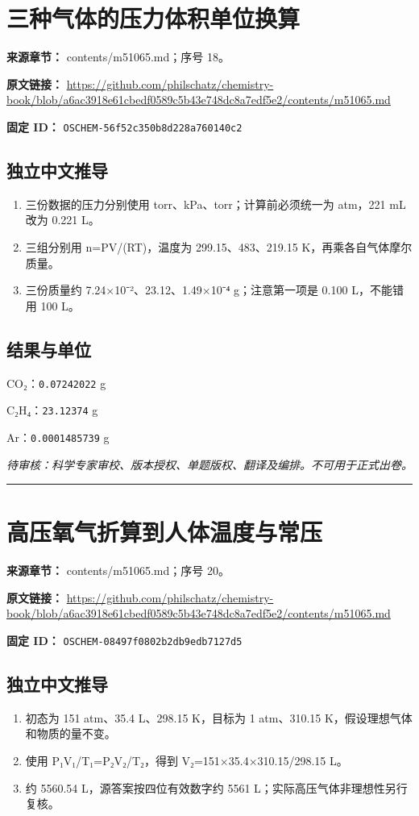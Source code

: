 \documentclass[UTF8,11pt,oneside,openany,fontset=none]{ctexbook}
\begin{document}
\section{三种气体的压力体积单位换算}
\noindent\textbf{来源章节：} contents/m51065.md；序号 18。\par
\noindent\textbf{原文链接：} \url{https://github.com/philschatz/chemistry-book/blob/a6ac3918e61cbedf0589c5b43e748dc8a7edf5e2/contents/m51065.md}\par
\noindent\textbf{固定 ID：} \texttt{OSCHEM-56f52c350b8d228a760140c2}\par
\subsection*{独立中文推导}
\begin{enumerate}
\item 三份数据的压力分别使用 torr、kPa、torr；计算前必须统一为 atm，221 mL 改为 0.221 L。
\item 三组分别用 n=PV/(RT)，温度为 299.15、483、219.15 K，再乘各自气体摩尔质量。
\item 三份质量约 7.24×10⁻²、23.12、1.49×10⁻⁴ g；注意第一项是 0.100 L，不能错用 100 L。
\end{enumerate}
\subsection*{结果与单位}
\noindent CO₂：\texttt{0.07242022} g\par
\noindent C₂H₄：\texttt{23.12374} g\par
\noindent Ar：\texttt{0.0001485739} g\par
\noindent\textit{待审核：科学专家审校、版本授权、单题版权、翻译及编排。不可用于正式出卷。}
\medskip\hrule\medskip
\section{高压氧气折算到人体温度与常压}
\noindent\textbf{来源章节：} contents/m51065.md；序号 20。\par
\noindent\textbf{原文链接：} \url{https://github.com/philschatz/chemistry-book/blob/a6ac3918e61cbedf0589c5b43e748dc8a7edf5e2/contents/m51065.md}\par
\noindent\textbf{固定 ID：} \texttt{OSCHEM-08497f0802b2db9edb7127d5}\par
\subsection*{独立中文推导}
\begin{enumerate}
\item 初态为 151 atm、35.4 L、298.15 K，目标为 1 atm、310.15 K，假设理想气体和物质的量不变。
\item 使用 P₁V₁/T₁=P₂V₂/T₂，得到 V₂=151×35.4×310.15/298.15 L。
\item 约 5560.54 L，源答案按四位有效数字约 5561 L；实际高压气体非理想性另行复核。
\end{enumerate}
\end{document}
